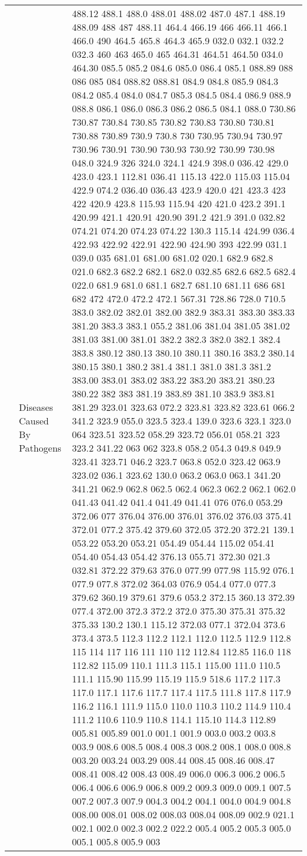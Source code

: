 \begin{longtable}{|L{.1in}|L{.6in}||L{5.65in}|}
    & Diseases Caused By Pathogens &  488.12 488.1 488.0 488.01 488.02 487.0 487.1 488.19 488.09 488 487 488.11 464.4 466.19 466 466.11 466.1 466.0 490 464.5 465.8 464.3 465.9 032.0 032.1 032.2 032.3 460 463 465.0 465 464.31 464.51 464.50 034.0 464.30 085.5 085.2 084.6 085.0 086.4 085.1 088.89 088 086 085 084 088.82 088.81 084.9 084.8 085.9 084.3 084.2 085.4 084.0 084.7 085.3 084.5 084.4 086.9 088.9 088.8 086.1 086.0 086.3 086.2 086.5 084.1 088.0 730.86 730.87 730.84 730.85 730.82 730.83 730.80 730.81 730.88 730.89 730.9 730.8 730 730.95 730.94 730.97 730.96 730.91 730.90 730.93 730.92 730.99 730.98 048.0 324.9 326 324.0 324.1 424.9 398.0 036.42 429.0 423.0 423.1 112.81 036.41 115.13 422.0 115.03 115.04 422.9 074.2 036.40 036.43 423.9 420.0 421 423.3 423 422 420.9 423.8 115.93 115.94 420 421.0 423.2 391.1 420.99 421.1 420.91 420.90 391.2 421.9 391.0 032.82 074.21 074.20 074.23 074.22 130.3 115.14 424.99 036.4 422.93 422.92 422.91 422.90 424.90 393 422.99 031.1 039.0 035 681.01 681.00 681.02 020.1 682.9 682.8 021.0 682.3 682.2 682.1 682.0 032.85 682.6 682.5 682.4 022.0 681.9 681.0 681.1 682.7 681.10 681.11 686 681 682 472 472.0 472.2 472.1 567.31 728.86 728.0 710.5 383.0 382.02 382.01 382.00 382.9 383.31 383.30 383.33 381.20 383.3 383.1 055.2 381.06 381.04 381.05 381.02 381.03 381.00 381.01 382.2 382.3 382.0 382.1 382.4 383.8 380.12 380.13 380.10 380.11 380.16 383.2 380.14 380.15 380.1 380.2 381.4 381.1 381.0 381.3 381.2 383.00 383.01 383.02 383.22 383.20 383.21 380.23 380.22 382 383 381.19 383.89 381.10 383.9 383.81 381.29 323.01 323.63 072.2 323.81 323.82 323.61 066.2 341.2 323.9 055.0 323.5 323.4 139.0 323.6 323.1 323.0 064 323.51 323.52 058.29 323.72 056.01 058.21 323 323.2 341.22 063 062 323.8 058.2 054.3 049.8 049.9 323.41 323.71 046.2 323.7 063.8 052.0 323.42 063.9 323.02 036.1 323.62 130.0 063.2 063.0 063.1 341.20 341.21 062.9 062.8 062.5 062.4 062.3 062.2 062.1 062.0 041.43 041.42 041.4 041.49 041.41 076 076.0 053.29 372.06 077 376.04 376.00 376.01 376.02 376.03 375.41 372.01 077.2 375.42 379.60 372.05 372.20 372.21 139.1 053.22 053.20 053.21 054.49 054.44 115.02 054.41 054.40 054.43 054.42 376.13 055.71 372.30 021.3 032.81 372.22 379.63 376.0 077.99 077.98 115.92 076.1 077.9 077.8 372.02 364.03 076.9 054.4 077.0 077.3 379.62 360.19 379.61 379.6 053.2 372.15 360.13 372.39 077.4 372.00 372.3 372.2 372.0 375.30 375.31 375.32 375.33 130.2 130.1 115.12 372.03 077.1 372.04 373.6 373.4 373.5 112.3 112.2 112.1 112.0 112.5 112.9 112.8 115 114 117 116 111 110 112 112.84 112.85 116.0 118 112.82 115.09 110.1 111.3 115.1 115.00 111.0 110.5 111.1 115.90 115.99 115.19 115.9 518.6 117.2 117.3 117.0 117.1 117.6 117.7 117.4 117.5 111.8 117.8 117.9 116.2 116.1 111.9 115.0 110.0 110.3 110.2 114.9 110.4 111.2 110.6 110.9 110.8 114.1 115.10 114.3 112.89 005.81 005.89 001.0 001.1 001.9 003.0 003.2 003.8 003.9 008.6 008.5 008.4 008.3 008.2 008.1 008.0 008.8 003.20 003.24 003.29 008.44 008.45 008.46 008.47 008.41 008.42 008.43 008.49 006.0 006.3 006.2 006.5 006.4 006.6 006.9 006.8 009.2 009.3 009.0 009.1 007.5 007.2 007.3 007.9 004.3 004.2 004.1 004.0 004.9 004.8 008.00 008.01 008.02 008.03 008.04 008.09 002.9 021.1 002.1 002.0 002.3 002.2 022.2 005.4 005.2 005.3 005.0 005.1 005.8 005.9 003 
\end{longtable}
